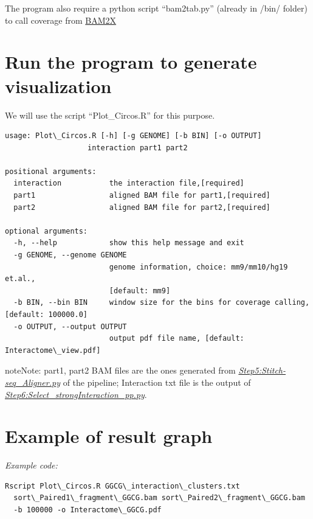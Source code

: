 \documentclass[letterpaper,10pt,english]{sphinxmanual}
\begin{document}
The program also require a python script ``bam2tab.py'' (already in /bin/ folder) to call coverage from \href{https://github.com/nimezhu/bam2x/blob/master/scripts/bed2tab.py}{BAM2X}


\section{Run the program to generate visualization}
\label{Visualization:id2}
We will use the script ``Plot\_Circos.R'' for this purpose.

\begin{Verbatim}[commandchars=\\\{\}]
usage: Plot\_Circos.R [-h] [-g GENOME] [-b BIN] [-o OUTPUT]
                   interaction part1 part2

positional arguments:
  interaction           the interaction file,[required]
  part1                 aligned BAM file for part1,[required]
  part2                 aligned BAM file for part2,[required]

optional arguments:
  -h, --help            show this help message and exit
  -g GENOME, --genome GENOME
                        genome information, choice: mm9/mm10/hg19 et.al.,
                        [default: mm9]
  -b BIN, --bin BIN     window size for the bins for coverage calling, [default: 100000.0]
  -o OUTPUT, --output OUTPUT
                        output pdf file name, [default: Interactome\_view.pdf]
\end{Verbatim}

\begin{notice}{note}{Note:}
part1, part2 BAM files are the ones generated from {\hyperref[Analysis_pipeline:step5]{\emph{Step5:Stitch-seq\_Aligner.py}}} of the pipeline; Interaction txt file is the output of {\hyperref[Analysis_pipeline:step6]{\emph{Step6:Select\_strongInteraction\_pp.py}}}.
\end{notice}


\section{Example of result graph}
\label{Visualization:id3}
\emph{Example code:}

\begin{Verbatim}[commandchars=\\\{\}]
Rscript Plot\_Circos.R GGCG\_interaction\_clusters.txt
  sort\_Paired1\_fragment\_GGCG.bam sort\_Paired2\_fragment\_GGCG.bam
  -b 100000 -o Interactome\_GGCG.pdf
\end{Verbatim}
\end{document}
